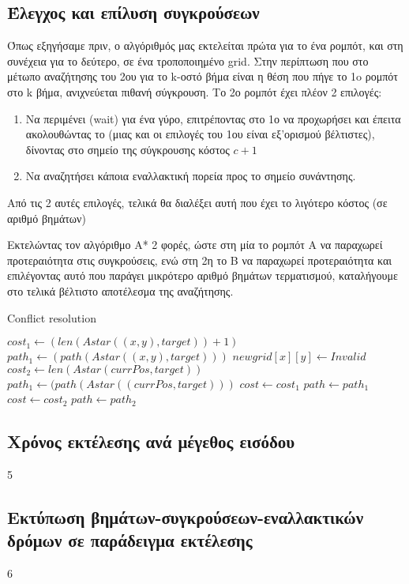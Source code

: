 \documentclass[a4paper,12pt]{article}
\begin{document}
\subsection{Έλεγχος και επίλυση συγκρούσεων}
Όπως εξηγήσαμε πριν, ο αλγόριθμός μας εκτελείται πρώτα για το ένα ρομπότ, και
στη συνέχεια για το δεύτερο, σε ένα τροποποιημένο grid. Στην περίπτωση που στο
μέτωπο αναζήτησης του 2ου για το k-οστό βήμα είναι η θέση που πήγε το 1o
ρομπότ στο k βήμα, ανιχνεύεται πιθανή σύγκρουση. Το 2ο ρομπότ έχει πλέον 2
επιλογές:
\begin{enumerate}
    \item Να περιμένει (wait) για ένα γύρο, επιτρέποντας στο 1ο να προχωρήσει
    και έπειτα ακολουθώντας το (μιας και οι επιλογές του 1ου είναι εξ'ορισμού
    βέλτιστες), δίνοντας στο σημείο της σύγκρουσης κόστος $c+1$
    \item Να αναζητήσει κάποια εναλλακτική πορεία προς το σημείο συνάντησης.
\end{enumerate}
Από τις 2 αυτές επιλογές, τελικά θα διαλέξει αυτή που έχει το λιγότερο κόστος
(σε αριθμό βημάτων)

Εκτελώντας τον αλγόριθμο A* 2 φορές, ώστε στη μία το ρομπότ A να παραχωρεί
προτεραιότητα στις συγκρούσεις, ενώ στη 2η το Β να παραχωρεί προτεραιότητα και
επιλέγοντας αυτό που παράγει μικρότερο αριθμό βημάτων τερματισμού, καταλήγουμε
στο τελικά βέλτιστο αποτέλεσμα της αναζήτησης.

\begin{algorithm}[H]
\caption{Conflict resolution}
\begin{algorithmic}[1]
	\State $cost_1 \gets (len(Astar((x,y), target)) + 1)$
	\State $path_1 \gets (path(Astar((x,y), target)))$
	\State $newgrid[x][y] \gets Invalid$
	\State $cost_2 \gets len(Astar(currPos, target))$
	\State $path_1 \gets (path(Astar((currPos, target)))$
	    \State $cost \gets cost_1$
	    \State $path \gets path_1$
	\Else
	    \State $cost \gets cost_2$
	    \State $path \gets path_2$
	\EndIf
    \EndIf
\EndProcedure
\end{algorithmic}
\end{algorithm}

\subsection{Χρόνος εκτέλεσης ανά μέγεθος εισόδου}
5

\subsection{Εκτύπωση βημάτων-συγκρούσεων-εναλλακτικών δρόμων σε παράδειγμα
εκτέλεσης}
6
\end{document}
